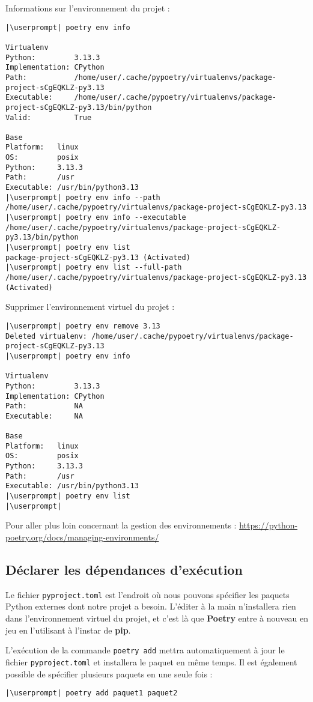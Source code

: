 Informations sur l'environnement du projet :
\begin{lstlisting}[style=bash]
|\userprompt| poetry env info

Virtualenv
Python:         3.13.3
Implementation: CPython
Path:           /home/user/.cache/pypoetry/virtualenvs/package-project-sCgEQKLZ-py3.13
Executable:     /home/user/.cache/pypoetry/virtualenvs/package-project-sCgEQKLZ-py3.13/bin/python
Valid:          True

Base
Platform:   linux
OS:         posix
Python:     3.13.3
Path:       /usr
Executable: /usr/bin/python3.13
|\userprompt| poetry env info --path
/home/user/.cache/pypoetry/virtualenvs/package-project-sCgEQKLZ-py3.13
|\userprompt| poetry env info --executable
/home/user/.cache/pypoetry/virtualenvs/package-project-sCgEQKLZ-py3.13/bin/python
|\userprompt| poetry env list
package-project-sCgEQKLZ-py3.13 (Activated)
|\userprompt| poetry env list --full-path
/home/user/.cache/pypoetry/virtualenvs/package-project-sCgEQKLZ-py3.13 (Activated)
\end{lstlisting}

Supprimer l'environnement virtuel du projet :
\begin{lstlisting}[style=bash]
|\userprompt| poetry env remove 3.13
Deleted virtualenv: /home/user/.cache/pypoetry/virtualenvs/package-project-sCgEQKLZ-py3.13
|\userprompt| poetry env info

Virtualenv
Python:         3.13.3
Implementation: CPython
Path:           NA
Executable:     NA

Base
Platform:   linux
OS:         posix
Python:     3.13.3
Path:       /usr
Executable: /usr/bin/python3.13
|\userprompt| poetry env list
|\userprompt| 
\end{lstlisting}

Pour aller plus loin concernant la gestion des environnements : \url{https://python-poetry.org/docs/managing-environments/}

\subsection*{Déclarer les dépendances d'exécution}
Le fichier \texttt{pyproject.toml} est l'endroit où nous pouvons spécifier les paquets Python externes dont notre projet a besoin. L'éditer à la main n'installera rien dans l'environnement virtuel du projet, et c'est là que \textbf{Poetry} entre à nouveau en jeu en l'utilisant à l'instar de \textbf{pip}.

L'exécution de la commande \texttt{poetry add} mettra automatiquement à jour le fichier \texttt{pyproject.toml} et installera le paquet en même temps. Il est également possible de spécifier plusieurs paquets en une seule fois :
\begin{lstlisting}[style=bash]
|\userprompt| poetry add paquet1 paquet2
\end{lstlisting}

